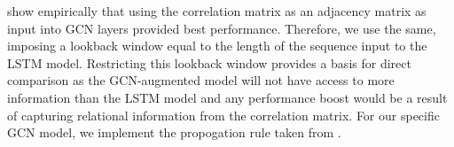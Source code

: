 \cite{Peng2021} show empirically that using the correlation matrix as an adjacency matrix as input into GCN layers provided best performance. Therefore, we use the same, imposing a lookback window equal to the length of the sequence input to the LSTM model. Restricting this lookback window provides a basis for direct comparison as the GCN-augmented model will not have access to more information than the LSTM model and any performance boost would be a result of capturing relational information from the correlation matrix. For our specific GCN model, we implement the propogation rule taken from \cite{Kipf2017}.